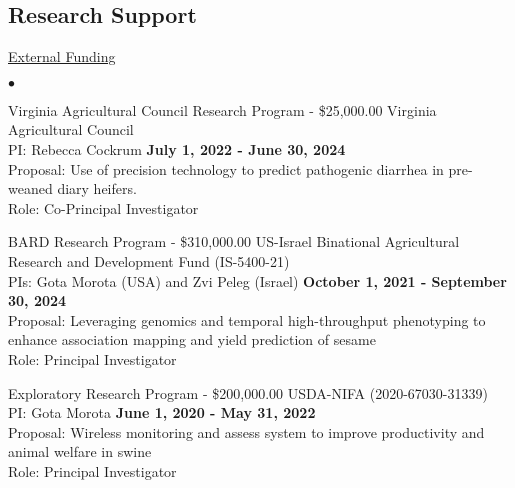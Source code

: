\documentclass[margin,line,10pt]{res}
\newenvironment{list2}{
  \begin{list}{$\bullet$}{%
      \setlength{\itemsep}{0in}
      \setlength{\parsep}{0in} \setlength{\parskip}{0in}
      \setlength{\topsep}{0in} \setlength{\partopsep}{0in} 
      \setlength{\leftmargin}{0.2in}}}{\end{list}}
\begin{document}
\begin{resume}
\vspace{0.5cm}
\section{\sc Research Support}
\begin{flushleft}
\hspace{0.2cm} \underline{External Funding}
\end{flushleft}

\begin{list2}

  \item Virginia Agricultural Council Research Program - \$25,000.00  \hfill Virginia Agricultural Council \\
  PI: Rebecca Cockrum  \hfill \textbf{July 1, 2022 -  June 30, 2024}\\
Proposal: Use of precision technology to predict pathogenic diarrhea in pre-weaned diary heifers.  \\
Role: Co-Principal Investigator \\

\vspace{0.5cm}


\item BARD Research Program - \$310,000.00  \hfill US-Israel Binational Agricultural Research and Development Fund (IS-5400-21) \\
  PIs: Gota Morota (USA) and Zvi Peleg (Israel)   \hfill \textbf{October 1, 2021 -  September 30, 2024}\\
Proposal: Leveraging genomics and temporal high-throughput phenotyping to enhance association mapping and yield prediction of sesame  \\
Role: Principal Investigator \\


\vspace{0.5cm}


\item Exploratory Research Program - \$200,000.00  \hfill USDA-NIFA (2020-67030-31339)\\
  PI: Gota Morota   \hfill \textbf{June 1, 2020 -  May 31, 2022}\\
Proposal: Wireless monitoring and assess system to improve productivity and animal welfare in swine  \\
Role: Principal Investigator \\


\vspace{0.5cm}




\end{list2}
\end{resume}
\end{document}
